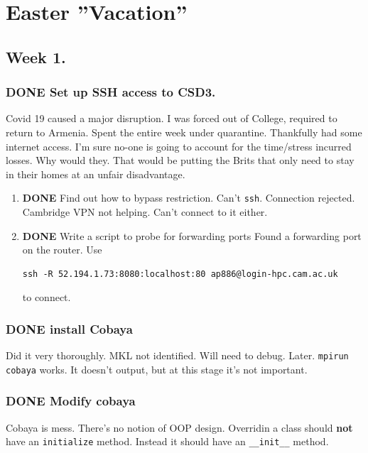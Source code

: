 \documentclass[11pt]{article}
\begin{document}
\section{Easter ''Vacation''}
\label{sec:org4a53e7a}
\subsection{Week 1.}
\label{sec:orgc65ae4d}
\subsubsection{{\bfseries\sffamily DONE} Set up SSH access to CSD3.}
\label{sec:org2a19475}
Covid 19 caused a major disruption.  I was forced out of College,
required to return to Armenia. Spent the entire week under
quarantine.  Thankfully had some internet access. I'm sure no-one
is going to account for the time/stress incurred losses. Why would
they. That would be putting the Brits that only need to stay in
their homes at an unfair disadvantage.
\begin{enumerate}
\item {\bfseries\sffamily DONE} Find out how to bypass restriction.
\label{sec:org199826f}
Can't \texttt{ssh}. Connection rejected. Cambridge VPN not helping. Can't
connect to it either. 
\item {\bfseries\sffamily DONE} Write a script to probe for forwarding ports
\label{sec:orgb3c9e0e}
Found a forwarding port on the router. Use
\begin{verbatim}
ssh -R 52.194.1.73:8080:localhost:80 ap886@login-hpc.cam.ac.uk
\end{verbatim}
to connect.
\end{enumerate}
\subsubsection{{\bfseries\sffamily DONE} install Cobaya}
\label{sec:orge7098b7}
Did it very thoroughly. MKL not identified. Will need to
debug. Later. \texttt{mpirun cobaya} works. It doesn't output, but at
this stage it's not important.
\subsubsection{{\bfseries\sffamily DONE} Modify cobaya}
\label{sec:orgaff4f6c}
Cobaya is mess. There's no notion of OOP design. Overridin a class
should \textbf{not} have an \texttt{initialize} method. Instead it should have
an \texttt{\_\_init\_\_} method. 
\end{document}

